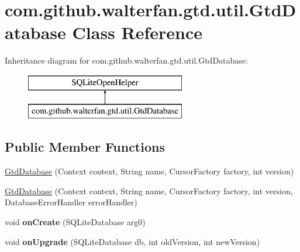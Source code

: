 \hypertarget{classcom_1_1github_1_1walterfan_1_1gtd_1_1util_1_1GtdDatabase}{\section{com.\-github.\-walterfan.\-gtd.\-util.\-Gtd\-Database Class Reference}
\label{classcom_1_1github_1_1walterfan_1_1gtd_1_1util_1_1GtdDatabase}
}
Inheritance diagram for com.\-github.\-walterfan.\-gtd.\-util.\-Gtd\-Database\-:\begin{figure}[H]
\begin{center}
\leavevmode
\includegraphics[height=2.000000cm]{classcom_1_1github_1_1walterfan_1_1gtd_1_1util_1_1GtdDatabase}
\end{center}
\end{figure}
\subsection*{Public Member Functions}
\begin{DoxyCompactItemize}
\item 
\hyperlink{classcom_1_1github_1_1walterfan_1_1gtd_1_1util_1_1GtdDatabase_a3e80ee44f75a3b005821f1d078fe605d}{Gtd\-Database} (Context context, String name, Cursor\-Factory factory, int version)
\item 
\hyperlink{classcom_1_1github_1_1walterfan_1_1gtd_1_1util_1_1GtdDatabase_ae7fee67455c42c67ad616ba7c730e241}{Gtd\-Database} (Context context, String name, Cursor\-Factory factory, int version, Database\-Error\-Handler error\-Handler)
\item 
\hypertarget{classcom_1_1github_1_1walterfan_1_1gtd_1_1util_1_1GtdDatabase_a8ab7859d689ca38989723e802667ec1f}{void {\bfseries on\-Create} (S\-Q\-Lite\-Database arg0)}\label{classcom_1_1github_1_1walterfan_1_1gtd_1_1util_1_1GtdDatabase_a8ab7859d689ca38989723e802667ec1f}

\item 
\hypertarget{classcom_1_1github_1_1walterfan_1_1gtd_1_1util_1_1GtdDatabase_a446d976704e723622be388de26f2314c}{void {\bfseries on\-Upgrade} (S\-Q\-Lite\-Database db, int old\-Version, int new\-Version)}\label{classcom_1_1github_1_1walterfan_1_1gtd_1_1util_1_1GtdDatabase_a446d976704e723622be388de26f2314c}

\end{DoxyCompactItemize}


